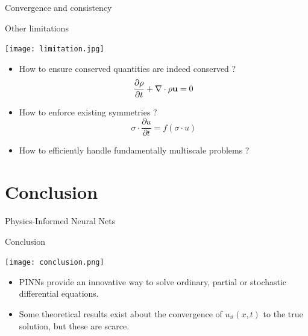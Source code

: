 \documentclass[aspectratio=169,compress,12pt,dvipsnames]{beamer}
\begin{document}
\begin{frame}{Convergence and consistency}
  \vfill
  \vfill
\end{frame}

\begin{frame}{Other limitations}
  \vfill
  \begin{minipage}{.28\textwidth}
    \centering
    \texttt{[image: limitation.jpg]}
  \end{minipage}%
  \hfill
  \begin{minipage}{.68\textwidth}
    \begin{itemize}
      \item How to ensure conserved quantities are indeed conserved ?
        \[
          \dfrac{\partial \rho}{\partial t} + \nabla \cdot \rho \vb{u} = 0
        \]
      \item How to enforce existing symmetries ?
        \[
          \sigma \cdot \dfrac{\partial u}{\partial t} = f(\sigma \cdot u)
        \]
      \item How to efficiently handle fundamentally multiscale problems ?
    \end{itemize}
  \end{minipage}
  \vfill
\end{frame}

\section{Conclusion}

\begin{frame}
  \vfill
  { Physics-Informed Neural Nets}

  { Conclusion}
  \vfill
\end{frame}

\begin{frame}
  \vfill
  \begin{minipage}{.28\textwidth}
    \centering
    \texttt{[image: conclusion.png]}
  \end{minipage}%
  \hfill
  \begin{minipage}{.68\textwidth}
    \begin{itemize}
      \item PINNs provide an innovative way to solve ordinary, partial or stochastic differential equations.
        \par
      \item Some theoretical results exist about the convergence of $u_{\vartheta}(x, t)$ to the true solution, but these are scarce.
    \end{itemize}
  \end{minipage}
  \vfill
\end{frame}
\end{document}
